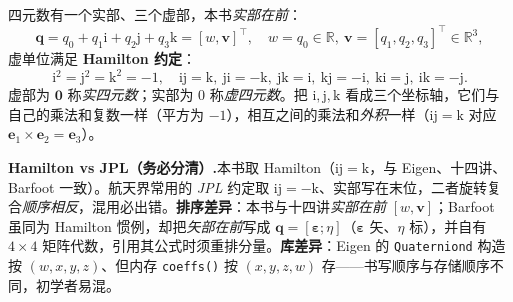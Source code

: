 \begin{definition}\label{def:quat}
四元数有一个实部、三个虚部，本书\emph{实部在前}：
\begin{equation}
  \mathbf{q}=q_0+q_1\mathrm{i}+q_2\mathrm{j}+q_3\mathrm{k}=[w,\mathbf{v}]^\top,\quad w=q_0\in\mathbb{R},\ \mathbf{v}=[q_1,q_2,q_3]^\top\in\mathbb{R}^3,
\end{equation}
虚单位满足 \textbf{Hamilton 约定}：
\begin{equation}
  \mathrm{i}^2=\mathrm{j}^2=\mathrm{k}^2=-1,\quad \mathrm{ij}=\mathrm{k},\ \mathrm{ji}=-\mathrm{k},\ \mathrm{jk}=\mathrm{i},\ \mathrm{kj}=-\mathrm{i},\ \mathrm{ki}=\mathrm{j},\ \mathrm{ik}=-\mathrm{j}.
  \label{eq:rb-quat-rules}
\end{equation}
虚部为 $\mathbf{0}$ 称\emph{实四元数}；实部为 $0$ 称\emph{虚四元数}。把 $\mathrm{i,j,k}$ 看成三个坐标轴，它们与自己的乘法和复数一样（平方为 $-1$），相互之间的乘法和\emph{外积}一样（$\mathrm{ij}=\mathrm{k}$ 对应 $\mathbf{e}_1\times\mathbf{e}_2=\mathbf{e}_3$）。
\end{definition}

\begin{note}
\textbf{Hamilton vs JPL（务必分清）.}\;本书取 Hamilton（$\mathrm{ij}=\mathrm{k}$，与 Eigen、十四讲、Barfoot 一致）。航天界常用的 \emph{JPL} 约定取 $\mathrm{ij}=-\mathrm{k}$、实部写在末位，二者旋转复合\emph{顺序相反}，混用必出错。\textbf{排序差异}：本书与十四讲\emph{实部在前} $[w,\mathbf{v}]$；Barfoot 虽同为 Hamilton 惯例，却把\emph{矢部在前}写成 $\mathbf{q}=[\boldsymbol{\varepsilon};\eta]$（$\boldsymbol{\varepsilon}$ 矢、$\eta$ 标），并自有 $4\times4$ 矩阵代数，引用其公式时须重排分量。\textbf{库差异}：Eigen 的 \texttt{Quaterniond} 构造按 $(w,x,y,z)$、但内存 \texttt{coeffs()} 按 $(x,y,z,w)$ 存——书写顺序与存储顺序不同，初学者易混。
\end{note}

